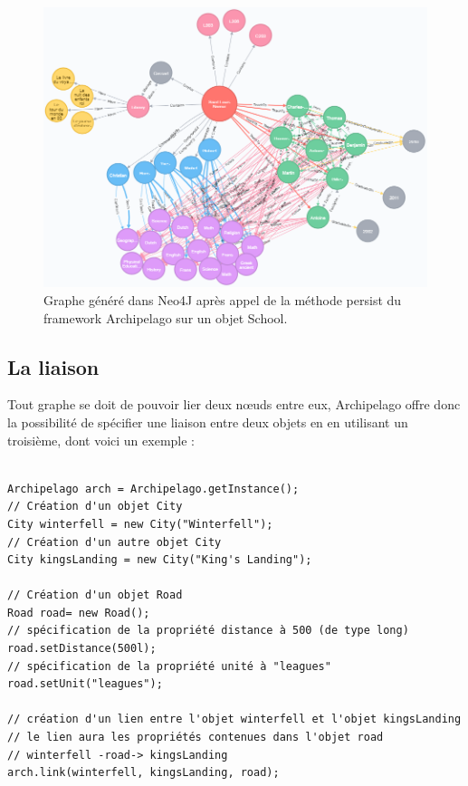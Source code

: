 \documentclass[a4paper,fleqn,12pt,oneside]{book}
\begin{document}
\begin{figure}[!ht]
\centering
\includegraphics[scale=0.9]{figures/ecoleNeo4J.png}
\caption{Graphe généré dans Neo4J après appel de la méthode persist du framework Archipelago sur un objet School.}
\label{fig:ecoleNeo4J}
\end{figure}

\newpage
\subsection{La liaison}

Tout graphe se doit de pouvoir lier deux nœuds entre eux, Archipelago offre donc la possibilité de spécifier une liaison entre deux objets en en utilisant un troisième, dont voici un exemple : 

\begin{lstlisting}

Archipelago arch = Archipelago.getInstance();
// Création d'un objet City
City winterfell = new City("Winterfell");
// Création d'un autre objet City
City kingsLanding = new City("King's Landing");

// Création d'un objet Road
Road road= new Road();
// spécification de la propriété distance à 500 (de type long)
road.setDistance(500l);
// spécification de la propriété unité à "leagues"
road.setUnit("leagues");
        
// création d'un lien entre l'objet winterfell et l'objet kingsLanding
// le lien aura les propriétés contenues dans l'objet road
// winterfell -road-> kingsLanding
arch.link(winterfell, kingsLanding, road);

\end{lstlisting}
\end{document}
